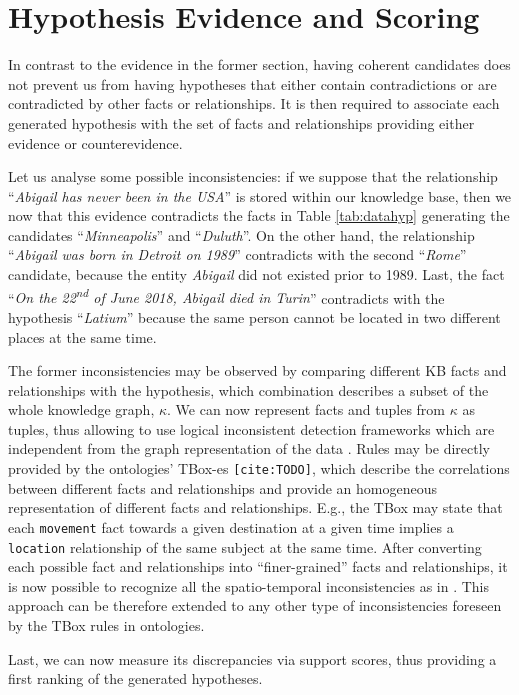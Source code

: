 \section{Hypothesis Evidence and Scoring}\label{sec:scoring}
In contrast to the evidence in the former section, having coherent candidates does not prevent us from having hypotheses that either contain contradictions or are contradicted by other facts or relationships. It is then required to associate each generated hypothesis with the set of facts and relationships providing either evidence or counterevidence. 

Let us analyse some possible inconsistencies: if we suppose that the relationship ``\textit{Abigail has never been in the USA}'' is stored within our knowledge base, then we now that this evidence contradicts the facts in Table \ref{tab:datahyp} generating the candidates ``\textit{Minneapolis}'' and ``\textit{Duluth}''. On the other hand, the relationship ``\textit{Abigail was born in Detroit on 1989}''  contradicts with the second ``\textit{Rome}'' candidate, because the entity \textit{Abigail} did not existed prior to 1989. Last, the fact ``\textit{On the 22\textsuperscript{nd} of June 2018, Abigail died in Turin}'' contradicts with the hypothesis ``\textit{Latium}'' because the same person cannot be located in two different places at the same time. 

The former inconsistencies may be observed by comparing different KB facts and relationships with the hypothesis, which combination describes a subset of the whole knowledge graph, $\kappa$. We can now represent facts and tuples from $\kappa$ as tuples, thus allowing to use logical inconsistent detection frameworks which are independent from the graph representation of the data \cite{MINOUX19881}. Rules may be directly provided by the ontologies' TBox-es \texttt{[cite:TODO]}, which describe the correlations between different facts and relationships and provide an homogeneous representation of different facts and relationships. E.g., the TBox may state that each \texttt{movement} fact towards a given destination at a given time implies a \texttt{location} relationship of the same subject at the same time. After converting each possible fact and relationships into ``finer-grained'' facts and relationships, it is now possible to recognize all the spatio-temporal inconsistencies as in \cite{gmmp18}. This approach can  be therefore extended to any other type of inconsistencies foreseen by the  TBox rules in ontologies. 

Last, we can now measure its discrepancies via support scores, thus providing a first ranking of the generated hypotheses. 